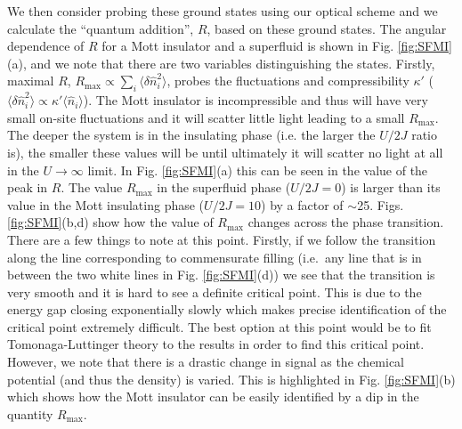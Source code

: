 We then consider probing these ground states using our optical scheme
and we calculate the ``quantum addition'', $R$, based on these ground
states. The angular dependence of $R$ for a Mott insulator and a
superfluid is shown in Fig. \ref{fig:SFMI}(a), and we note that there
are two variables distinguishing the states. Firstly, maximal $R$,
$R_\text{max} \propto \sum_i \langle \delta \hat{n}_i^2 \rangle$,
probes the fluctuations and compressibility $\kappa'$
($\langle \delta \hat{n}^2_i \rangle \propto \kappa' \langle \hat{n}_i
\rangle$).  The Mott insulator is incompressible and thus will have
very small on-site fluctuations and it will scatter little light
leading to a small $R_\text{max}$. The deeper the system is in the
insulating phase (i.e. the larger the $U/2J$ ratio is), the smaller
these values will be until ultimately it will scatter no light at all
in the $U \rightarrow \infty$ limit. In Fig. \ref{fig:SFMI}(a) this
can be seen in the value of the peak in $R$. The value $R_\text{max}$
in the superfluid phase ($U/2J = 0$) is larger than its value in the
Mott insulating phase ($U/2J = 10$) by a factor of
$\sim$25. Figs. \ref{fig:SFMI}(b,d) show how the value of
$R_\text{max}$ changes across the phase transition. There are a few
things to note at this point. Firstly, if we follow the transition
along the line corresponding to commensurate filling (i.e.~any line
that is in between the two white lines in Fig. \ref{fig:SFMI}(d)) we
see that the transition is very smooth and it is hard to see a
definite critical point. This is due to the energy gap closing
exponentially slowly which makes precise identification of the
critical point extremely difficult. The best option at this point
would be to fit Tomonaga-Luttinger theory to the results in order to
find this critical point. However, we note that there is a drastic
change in signal as the chemical potential (and thus the density) is
varied. This is highlighted in Fig. \ref{fig:SFMI}(b) which shows how
the Mott insulator can be easily identified by a dip in the quantity
$R_\text{max}$.

